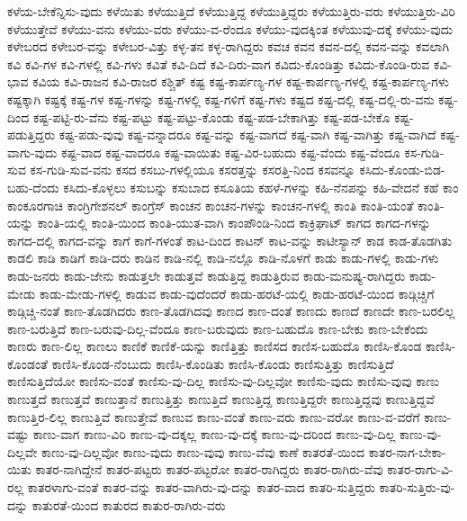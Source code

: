 {ಕಳೆಯ-ಬೇಕೆನ್ನಿಸು-ವುದು
ಕಳೆಯಿತು
ಕಳೆಯುತ್ತಿದೆ
ಕಳೆಯುತ್ತಿದ್ದ
ಕಳೆಯುತ್ತಿದ್ದರು
ಕಳೆಯುತ್ತಿರು-ವರು
ಕಳೆಯುತ್ತಿರು-ವಿರಿ
ಕಳೆಯುತ್ತೇವೆ
ಕಳೆಯು-ವನು
ಕಳೆಯು-ವರು
ಕಳೆಯು-ವ-ರೆಂದೂ
ಕಳೆಯು-ವುದಕ್ಕಿಂತ
ಕಳೆಯುವು-ದಕ್ಕೆ
ಕಳೆಯು-ವುದು
ಕಳೇಬರದ
ಕಳೇಬರ-ವನ್ನು
ಕಳೇಬರ-ವಿತ್ತು
ಕಳ್ಳ-ತನ
ಕಳ್ಳ-ರಾಗಿದ್ದರು
ಕವಚ
ಕವನ
ಕವನ-ದಲ್ಲಿ
ಕವನ-ವನ್ನು
ಕವಲಾಗಿ
ಕವಿ
ಕವಿ-ಗಳ
ಕವಿ-ಗಳಲ್ಲಿ
ಕವಿ-ಗಳು
ಕವಿತೆ
ಕವಿ-ದಿದೆ
ಕವಿ-ದಿರು-ವಾಗ
ಕವಿದು-ಕೊಂಡಿತ್ತು
ಕವಿದು-ಕೊಂಡಿ-ರುವ
ಕವಿ-ಭಾವ
ಕವಿಯ
ಕವಿ-ರಾಜನ
ಕವಿ-ರಾಜರ
ಕಶ್ಚಿತ್
ಕಷ್ಟ
ಕಷ್ಟ-ಕಾರ್ಪಣ್ಯ-ಗಳ
ಕಷ್ಟ-ಕಾರ್ಪಣ್ಯ-ಗಳಲ್ಲಿ
ಕಷ್ಟ-ಕಾರ್ಪಣ್ಯ-ಗಳು
ಕಷ್ಟಕ್ಕಾಗಿ
ಕಷ್ಟಕ್ಕೆ
ಕಷ್ಟ-ಗಳ
ಕಷ್ಟ-ಗಳನ್ನು
ಕಷ್ಟ-ಗಳಲ್ಲಿ
ಕಷ್ಟ-ಗಳಿಗೆ
ಕಷ್ಟ-ಗಳು
ಕಷ್ಟದ
ಕಷ್ಟ-ದಲ್ಲಿ
ಕಷ್ಟ-ದಲ್ಲಿ-ರು-ವನು
ಕಷ್ಟ-ದಿಂದ
ಕಷ್ಟ-ಪಟ್ಟಿ-ರು-ವೆನು
ಕಷ್ಟ-ಪಟ್ಟು
ಕಷ್ಟ-ಪಟ್ಟು-ಕೊಂಡು
ಕಷ್ಟ-ಪಡ-ಬೇಕಾಗಿತ್ತು
ಕಷ್ಟ-ಪಡ-ಬೇಕೊ
ಕಷ್ಟ-ಪಡುತ್ತಿದ್ದರು
ಕಷ್ಟ-ಪಡು-ವುವು
ಕಷ್ಟ-ವನ್ನಾದರೂ
ಕಷ್ಟ-ವನ್ನು
ಕಷ್ಟ-ವಾಗದೆ
ಕಷ್ಟ-ವಾಗಿ
ಕಷ್ಟ-ವಾಗಿತ್ತು
ಕಷ್ಟ-ವಾಗಿದೆ
ಕಷ್ಟ-ವಾಗು-ವುದು
ಕಷ್ಟ-ವಾದ
ಕಷ್ಟ-ವಾದರೂ
ಕಷ್ಟ-ವಾಯಿತು
ಕಷ್ಟ-ವಿರ-ಬಹುದು
ಕಷ್ಟ-ವೆಂದು
ಕಷ್ಟ-ವೆಂದೂ
ಕಸ-ಗುಡಿ-ಸುವ
ಕಸ-ಗುಡಿ-ಸುವ-ವನು
ಕಸದ
ಕಸಬು-ಗಳಲ್ಲಿಯೂ
ಕಸರತ್ತನ್ನು
ಕಸರತ್ತಿ-ನಿಂದ
ಕಸವನ್ನೂ
ಕಸಿದು-ಕೊಂಡು-ಬಿಡ-ಬಹು-ದೆಂದು
ಕಸಿದು-ಕೊಳ್ಳಲು
ಕಸುಬನ್ನು
ಕಸುಬಾದ
ಕಸೂತಿಯ
ಕಹಳೆ-ಗಳನ್ನು
ಕಹಿ-ನೆನಪನ್ನು
ಕಹಿ-ವೇದನೆ
ಕಹೆ
ಕಾಂ
ಕಾಂಕೂರಗಾಚಿ
ಕಾಂಗ್ರಿಗೇಶನಲ್
ಕಾಂಗ್ರೆಸ್
ಕಾಂಚನ
ಕಾಂಚನ-ಗಳನ್ನು
ಕಾಂಚನ-ಗಳಲ್ಲಿ
ಕಾಂತಿ
ಕಾಂತಿ-ಯಂತೆ
ಕಾಂತಿ-ಯನ್ನು
ಕಾಂತಿ-ಯಲ್ಲಿ
ಕಾಂತಿ-ಯಿಂದ
ಕಾಂತಿ-ಯುತ-ವಾಗಿ
ಕಾಂಪೌಂಡಿ-ನಿಂದ
ಕಾಕ್ರಿಘಾಟ್
ಕಾಗದ
ಕಾಗದ-ಗಳನ್ನು
ಕಾಗದ-ದಲ್ಲಿ
ಕಾಗದ-ವನ್ನು
ಕಾಗೆ
ಕಾಗೆ-ಗಳಂತೆ
ಕಾಟ-ದಿಂದ
ಕಾಟನ್
ಕಾಟ-ವನ್ನು
ಕಾಟೀಸ್ಯಾನ್
ಕಾಡ
ಕಾಡ-ತೊಡಗಿತು
ಕಾಡಲಿ
ಕಾಡಿ
ಕಾಡಿಗೆ
ಕಾಡಿ-ದರು
ಕಾಡಿನ
ಕಾಡಿ-ನಲ್ಲಿ
ಕಾಡಿ-ನಲ್ಲೊ
ಕಾಡಿ-ನೊಳಗೆ
ಕಾಡು
ಕಾಡು-ಗಳಲ್ಲಿ
ಕಾಡು-ಗಳು
ಕಾಡು-ಜನರು
ಕಾಡು-ಜೇನು
ಕಾಡುತ್ತಲೇ
ಕಾಡುತ್ತವೆ
ಕಾಡುತ್ತಿದ್ದ
ಕಾಡುತ್ತಿರುವ
ಕಾಡು-ಮನುಷ್ಯ-ರಾಗಿದ್ದರು
ಕಾಡು-ಮೇಡು
ಕಾಡು-ಮೇಡು-ಗಳಲ್ಲಿ
ಕಾಡುವ
ಕಾಡು-ವುದೆಂದರೆ
ಕಾಡು-ಹರಟೆ-ಯಲ್ಲಿ
ಕಾಡು-ಹರಟೆ-ಯಿಂದ
ಕಾಡ್ಗಿಚ್ಚಿಗೆ
ಕಾಡ್ಗಿಚ್ಚಿ-ನಂತೆ
ಕಾಣ-ತೊಡಗಿದರು
ಕಾಣ-ತೊಡಗಿದವು
ಕಾಣದ
ಕಾಣ-ದಂತೆ
ಕಾಣದು
ಕಾಣದೆ
ಕಾಣದೇ
ಕಾಣ-ಬರಲಿಲ್ಲ
ಕಾಣ-ಬರುತ್ತಿದೆ
ಕಾಣ-ಬರುವು-ದಿಲ್ಲ-ವೆಂದೂ
ಕಾಣ-ಬರುವುದು
ಕಾಣ-ಬಹುದೊ
ಕಾಣ-ಬೇಕು
ಕಾಣ-ಬೇಕೆಂದು
ಕಾಣರು
ಕಾಣ-ಲಿಲ್ಲ
ಕಾಣಲು
ಕಾಣಿಕೆ
ಕಾಣಿಕೆ-ಯನ್ನು
ಕಾಣಿತ್ತಿತ್ತು
ಕಾಣಿಸದ
ಕಾಣಿಸ-ಬಹುದೊ
ಕಾಣಿಸಿ-ಕೊಂಡ
ಕಾಣಿಸಿ-ಕೊಂಡಂತೆ
ಕಾಣಿಸಿ-ಕೊಂಡ-ನೆಂಬುದು
ಕಾಣಿಸಿ-ಕೊಂಡಿತು
ಕಾಣಿಸಿ-ಕೊಂಡು
ಕಾಣಿಸುತ್ತಿತ್ತು
ಕಾಣಿಸುತ್ತಿದೆ
ಕಾಣಿಸುತ್ತಿದೆಯೋ
ಕಾಣಿಸು-ವಂತೆ
ಕಾಣಿಸು-ವು-ದಿಲ್ಲ
ಕಾಣಿಸು-ವು-ದಿಲ್ಲವೋ
ಕಾಣಿಸು-ವುದು
ಕಾಣಿಸು-ವುವು
ಕಾಣು
ಕಾಣುತ್ತದೆ
ಕಾಣುತ್ತವೆ
ಕಾಣುತ್ತಾನೆ
ಕಾಣುತ್ತಿತ್ತು
ಕಾಣುತ್ತಿದೆ
ಕಾಣುತ್ತಿದ್ದ
ಕಾಣುತ್ತಿದ್ದರೇ
ಕಾಣುತ್ತಿದ್ದವು
ಕಾಣುತ್ತಿದ್ದವೆ
ಕಾಣುತ್ತಿರ-ಲಿಲ್ಲ
ಕಾಣುತ್ತಿವೆ
ಕಾಣುತ್ತೇವೆ
ಕಾಣುವ
ಕಾಣು-ವಂತೆ
ಕಾಣು-ವರು
ಕಾಣು-ವರೋ
ಕಾಣು-ವ-ವರೆಗೆ
ಕಾಣು-ವಷ್ಟು
ಕಾಣು-ವಾಗ
ಕಾಣು-ವಿರಿ
ಕಾಣು-ವು-ದಕ್ಕಲ್ಲ
ಕಾಣು-ವು-ದಕ್ಕೆ
ಕಾಣು-ವು-ದರಿಂದ
ಕಾಣು-ವು-ದಿಲ್ಲ
ಕಾಣು-ವು-ದಿಲ್ಲವೇ
ಕಾಣು-ವು-ದಿಲ್ಲವೋ
ಕಾಣು-ವುದು
ಕಾಣು-ವುವು
ಕಾಣು-ವೆವು
ಕಾಣೆ
ಕಾತರತೆ-ಯಿಂದ
ಕಾತರ-ನಾಗ-ಬೇಕಾ-ಯಿತು
ಕಾತರ-ನಾಗಿದ್ದೇನೆ
ಕಾತರ-ಪಟ್ಟರು
ಕಾತರ-ಪಟ್ಟರೋ
ಕಾತರ-ರಾಗಿದ್ದರು
ಕಾತರ-ರಾಗಿರು-ವೆವು
ಕಾತರ-ರಾಗು-ವಿ-ರಲ್ಲ
ಕಾತರಳಾಗು-ವಂತೆ
ಕಾತರ-ವನ್ನು
ಕಾತರ-ವಾಗಿರು-ವು-ದನ್ನು
ಕಾತರ-ವಾದ
ಕಾತರಿ-ಸುತ್ತಿದ್ದರು
ಕಾತರಿ-ಸುತ್ತಿರು-ವು-ದನ್ನು
ಕಾತುರತೆ-ಯಿಂದ
ಕಾತುರದ
ಕಾತುರ-ರಾಗಿರು-ವರು
}
